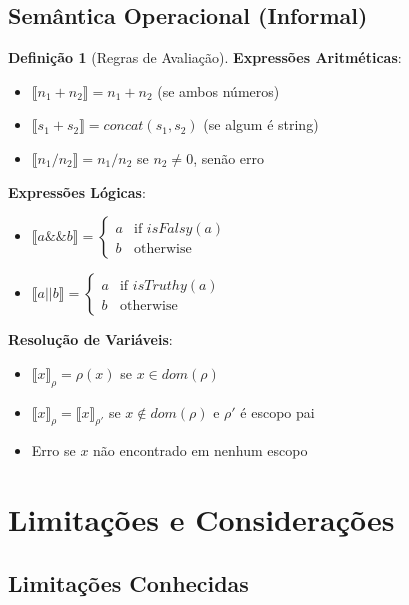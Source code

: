 \documentclass[12pt,a4paper]{article}
\theoremstyle{definition}
\newtheorem{definition}{Definição}[section]
\begin{document}
\subsection{Semântica Operacional (Informal)}

\begin{definition}[Regras de Avaliação]
\textbf{Expressões Aritméticas}:
\begin{itemize}
    \item $\llbracket n_1 + n_2 \rrbracket = n_1 + n_2$ (se ambos números)
    \item $\llbracket s_1 + s_2 \rrbracket = concat(s_1, s_2)$ (se algum é string)
    \item $\llbracket n_1 / n_2 \rrbracket = n_1 / n_2$ se $n_2 \neq 0$, senão erro
\end{itemize}

\textbf{Expressões Lógicas}:
\begin{itemize}
    \item $\llbracket a \&\& b \rrbracket = \begin{cases}
        a & \text{if } isFalsy(a) \\
        b & \text{otherwise}
    \end{cases}$
    
    \item $\llbracket a || b \rrbracket = \begin{cases}
        a & \text{if } isTruthy(a) \\
        b & \text{otherwise}
    \end{cases}$
\end{itemize}

\textbf{Resolução de Variáveis}:
\begin{itemize}
    \item $\llbracket x \rrbracket_{\rho} = \rho(x)$ se $x \in dom(\rho)$
    \item $\llbracket x \rrbracket_{\rho} = \llbracket x \rrbracket_{\rho'}$ se $x \notin dom(\rho)$ e $\rho'$ é escopo pai
    \item Erro se $x$ não encontrado em nenhum escopo
\end{itemize}
\end{definition}

\section{Limitações e Considerações}

\subsection{Limitações Conhecidas}
\end{document}
